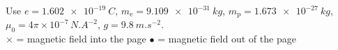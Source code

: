 \documentclass[12pt]{article}
\begin{document}
\begin{center}
  Use $e = \qty{1.602e-19}{C}$, $m_\mathrm{e} = \qty{9.109e-31}{kg}$, $m_\mathrm{p} = \qty{1.673e-27}{kg}$,
  $\mu_0 = 4\pi \times 10^{-7}\,\si{N.A^{-2}}$, $g = \qty{9.8}{m.s^{-2}}$.\\
  {\small $\times$ = magnetic field into the page \qquad $\bullet$ = magnetic field out of the page}
\end{center}
\end{document}
